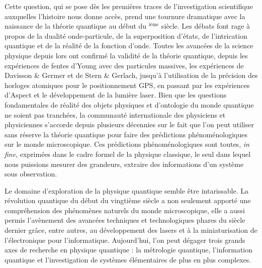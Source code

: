 \newcommand{\rom}[1]{\uppercase\expandafter{\romannumeral #1\relax}}
Cette question, qui se pose dès les premières traces de l'investigation scientifique auxquelles l'histoire nous donne accès, prend une tournure dramatique avec la naissance de la théorie quantique au début du \rom{20}$^{\text{ième}}$ siècle.
Les débats font rage à propos de la dualité onde-particule, de la superposition d'états, de l'intrication quantique et de la réalité de la fonction d'onde.
Toutes les avancées de la science physique depuis lors ont confirmé la validité de la théorie quantique, depuis les expériences de fentes d'Young avec des particules massives, les expériences de Davisson \& Germer et de Stern \& Gerlach, jusqu'à l'utilisation de la précision des horloges atomiques pour le positionnement GPS, en passant par les expériences d'Aspect et le développement de la lumière laser.
Bien que les questions fondamentales de réalité des objets physiques et d'ontologie du monde quantique ne soient pas tranchées, la communauté internationale des physiciens et physiciennes s'accorde depuis plusieurs décennies sur le fait que l'on peut utiliser sans réserve la théorie quantique pour faire des prédictions phénoménologiques sur le monde microscopique.
Ces prédictions phénoménologiques sont toutes, \textit{in fine}, exprimées dans le cadre formel de la physique classique, le seul dans lequel nous puissions mesurer des grandeurs, extraire des informations d'un système sous observation.

\bigskip
Le domaine d'exploration de la physique quantique semble être intarissable.
La \og révolution quantique \fg{} du début du vingtième siècle a non seulement apporté une compréhension des phénomènes naturels du monde microscopique, elle a aussi permis l'avènement des avancées techniques et technologiques phares du siècle dernier grâce, entre autres, au développement des lasers et à la miniaturisation de l'électronique pour l'informatique.
Aujourd'hui, l'on peut dégager trois grands axes de recherche en physique quantique : la métrologie quantique, l'information quantique et l'investigation de systèmes élémentaires de plus en plus complexes.

